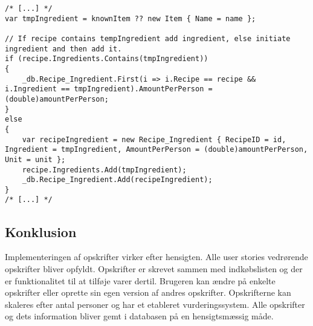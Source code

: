 \begin{lstlisting}[caption="Udklip fra AddIngredient som opretter og tilføjer ingredienser til en specifik opskrift - Her er vist hvad der er forskel fra AddItem i ShoppingListsController"]
/* [...] */          
var tmpIngredient = knownItem ?? new Item { Name = name };

// If recipe contains tempIngredient add ingredient, else initiate ingredient and then add it.
if (recipe.Ingredients.Contains(tmpIngredient))
{
    _db.Recipe_Ingredient.First(i => i.Recipe == recipe && i.Ingredient == tmpIngredient).AmountPerPerson = (double)amountPerPerson;
}
else
{
    var recipeIngredient = new Recipe_Ingredient { RecipeID = id, Ingredient = tmpIngredient, AmountPerPerson = (double)amountPerPerson, Unit = unit };
    recipe.Ingredients.Add(tmpIngredient);
    _db.Recipe_Ingredient.Add(recipeIngredient);
}
/* [...] */          
\end{lstlisting}


\subsection{Konklusion}
Implementeringen af opskrifter virker efter hensigten. 
Alle user stories vedrørende opskrifter bliver opfyldt. 
Opskrifter er skrevet sammen med indkøbslisten og der er funktionalitet til at tilføje varer dertil. 
Brugeren kan ændre på enkelte opskrifter eller oprette sin egen version af andres opskrifter. 
Opskrifterne kan skaleres efter antal personer og har et etableret vurderingssystem. 
Alle opskrifter og dets information bliver gemt i databasen på en hensigtsmæssig måde.
